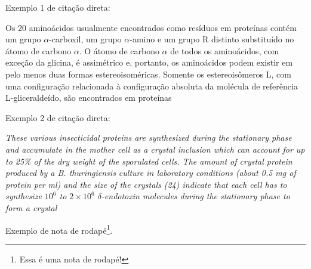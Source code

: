 Exemplo 1 de citação direta:

\begin{citacao}
	Os 20 aminoácidos usualmente encontrados como resíduos em proteínas contém um grupo $\alpha$-carboxil, um grupo $\alpha$-amino e um grupo R distinto substituído no átomo de carbono $\alpha$. O átomo de carbono $\alpha$ de todos os aminoácidos, com exceção da glicina, é assimétrico e, portanto, os aminoácidos podem existir em pelo menos duas formas estereoisoméricas. Somente os estereoisômeros L, com uma configuração relacionada à configuração absoluta da molécula de referência L-gliceraldeído, são encontrados em proteínas \cite[p. 81]{Nelson2014}
\end{citacao}

Exemplo 2 de citação direta:

\begin{citacao}
	\textit{These various insecticidal proteins are synthesized during the stationary phase and accumulate in the mother cell as a crystal inclusion which can account for up to 25\% of the dry weight of the sporulated cells. The amount of crystal protein produced by a B. thuringiensis culture in laboratory conditions (about 0.5 mg of protein per ml) and the size of the crystals (24) indicate that each cell has to synthesize $10^6$ to $2 \times 10^6$ $\delta$-endotoxin molecules during the stationary phase to form a crystal} \cite[p. 1]{Agaisse1995}
\end{citacao}

Exemplo de nota de rodapé\footnote{Essa é uma nota de rodapé!}.
